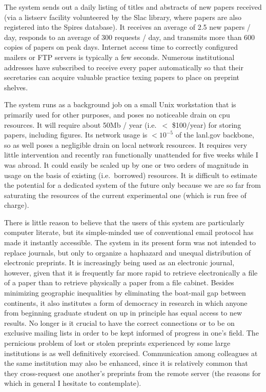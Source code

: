 The system sends out a daily listing of titles and abstracts of new papers
received (via a listserv facility volunteered by the Slac library, where
papers are also registered into the Spires database). It receives an
average of 2.5 new papers / day, responds to an average of 300 requests / day, 
and transmits more than 600 copies of papers on peak days. Internet
access time to correctly configured mailers or FTP servers is typically a
few seconds. Numerous institutional addresses have subscribed to receive
every paper automatically so that their secretaries can acquire valuable
practice texing papers to place on preprint shelves.

The system runs as a background job on a small Unix workstation that is
primarily used for other purposes, and poses no noticeable drain on cpu
resources. It will require about 50Mb / year (i.e.\ $<$ \$100/year) for
storing papers, including figures. Its network usage is $< 10^{-5}$ of the
lanl.gov backbone, so as well poses a negligible drain on local network
resources. It requires very little intervention and recently ran
functionally unattended for five weeks while I was abroad. It could easily
be scaled up by one or two orders of magnitude in usage on the basis of
existing (i.e.\ borrowed) resources. It is difficult to estimate the
potential for a dedicated system of the future only because we are so far
from saturating the resources of the current experimental one (which is run
free of charge).

There is little reason to believe that the users of this system are
particularly computer literate, but its simple-minded use of conventional
email protocol has made it instantly accessible. The system in its present
form was not intended to replace journals, but only to organize a
haphazard and unequal distribution of electronic preprints. It is
increasingly being used as an electronic journal, however, given that it
is frequently far more rapid to retrieve electronically a file of a paper
than to retrieve physically a paper from a file cabinet. Besides
minimizing geographic inequalities by eliminating the boat-mail gap
between continents, it also institutes a form of democracy in research in
which anyone from beginning graduate student on up in principle has equal
access to new results. No longer is it crucial to have the correct
connections or to be on exclusive mailing lists in order to be kept
informed of progress in one's field. The pernicious problem of lost or
stolen preprints experienced by some large institutions is as well
definitively exorcised. Communication among colleagues at the same
institution may also be enhanced, since it is relatively common that they
cross-request one another's preprints from the remote server (the reasons
for which in general I hesitate to contemplate).


